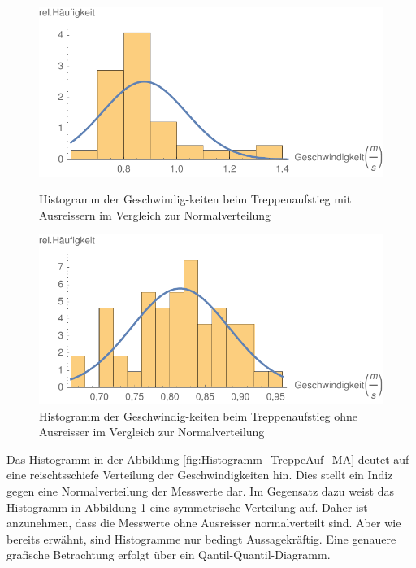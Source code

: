 \begin{figure}[!htb]
    \centering
    \begin{minipage}{.5\textwidth}
        \centering
        \includegraphics[width=\textwidth]{abbildungen/Histogramm_2017_TreppeAuf_MitAusreisser.pdf}
        \caption{Histogramm der Geschwindig-keiten beim Treppenaufstieg mit Ausreissern im Vergleich zur Normalverteilung}
        \label{fig:Histogramm_TreppeAuf_MA}
    \end{minipage}%
    \begin{minipage}{0.5\textwidth}
        \centering
        \includegraphics[width=\textwidth]{abbildungen/Histogramm_2017_TreppeAuf_OhneAusreisser.pdf}
        \caption{Histogramm der Geschwindig-keiten beim Treppenaufstieg ohne Ausreisser im Vergleich zur Normalverteilung}
        \label{fig:Histogramm_TreppeAuf_OA}
    \end{minipage}
\end{figure}

Das Histogramm in der Abbildung \ref{fig:Histogramm_TreppeAuf_MA} deutet auf eine reischtsschiefe Verteilung der Geschwindigkeiten hin. Dies stellt ein Indiz gegen eine Normalverteilung der Messwerte dar. Im Gegensatz dazu weist das Histogramm in Abbildung \ref{fig:Histogramm_TreppeAuf_OA} eine symmetrische Verteilung auf. Daher ist anzunehmen, dass die Messwerte ohne Ausreisser normalverteilt sind. Aber wie bereits erwähnt, sind Histogramme nur bedingt Aussagekräftig. Eine genauere grafische Betrachtung erfolgt über ein Qantil-Quantil-Diagramm.

